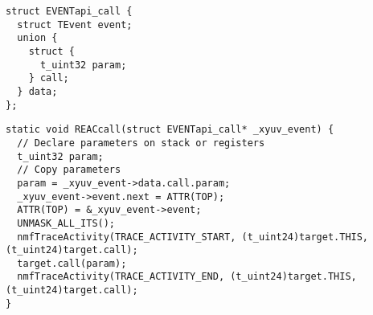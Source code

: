 \begin{lstlisting}[caption=struct EVENTapi\_call, label=EVENTapicall]
struct EVENTapi_call {
  struct TEvent event;
  union {
    struct {
      t_uint32 param;
    } call;
  } data;
};
\end{lstlisting}

\begin{lstlisting}[caption=MMDSP call() asynchronous skeleton
,label=skasyncgenerated]
static void REACcall(struct EVENTapi_call* _xyuv_event) {
  // Declare parameters on stack or registers
  t_uint32 param;
  // Copy parameters
  param = _xyuv_event->data.call.param;
  _xyuv_event->event.next = ATTR(TOP);
  ATTR(TOP) = &_xyuv_event->event;
  UNMASK_ALL_ITS();
  nmfTraceActivity(TRACE_ACTIVITY_START, (t_uint24)target.THIS, (t_uint24)target.call);
  target.call(param);
  nmfTraceActivity(TRACE_ACTIVITY_END, (t_uint24)target.THIS, (t_uint24)target.call);
}
\end{lstlisting}
